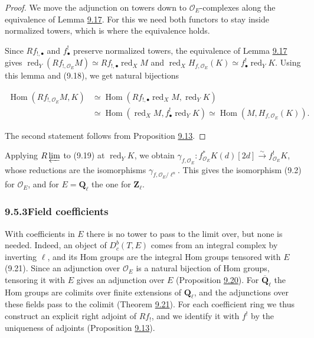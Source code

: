 \documentclass[11pt]{article}
\providecommand{\Dbc}{}\renewcommand{\Dbc}{D^b_c}
\providecommand{\Hom}{}\renewcommand{\Hom}{\operatorname{Hom}}
\begin{document}
\begin{proof}[{Proof}]\label{bp62}%
We move the adjunction on towers down to \(\mathcal O_E\)-complexes along the equivalence of Lemma \hyperref[bp55]{9.17}. For this we need both functors to stay inside normalized towers, which is where the equivalence holds.

Since \(Rf_{!,\bullet}\) and \(f^!_\bullet\) preserve normalized towers, the equivalence of Lemma \hyperref[bp55]{9.17} gives \(\operatorname{red}_Y(Rf_{!,\mathcal O_E}M)\simeq Rf_{!,\bullet}\operatorname{red}_XM\) and \(\operatorname{red}_XH_{f,\mathcal O_E}(K)\simeq f^!_\bullet\operatorname{red}_YK\). Using this lemma and (9.18), we get natural bijections

\[
\begin{aligned}
\Hom(Rf_{!,\mathcal O_E}M,K)
&\simeq\Hom(Rf_{!,\bullet}\operatorname{red}_XM,\operatorname{red}_YK)\\
&\simeq\Hom(\operatorname{red}_XM,f_\bullet^!\operatorname{red}_YK)
\simeq\Hom(M,H_{f,\mathcal O_E}(K)).
\end{aligned}
\]

The second statement follows from Proposition \hyperref[bp41]{9.13}.
\end{proof}

\label{bp63}%
Applying \(R\varprojlim\) to (9.19) at \(\operatorname{red}_YK\), we obtain \(\gamma_{f,\mathcal O_E}:f^*_{\mathcal O_E}K(d)[2d]\xrightarrow{\sim}f^!_{\mathcal O_E}K\), whose reductions are the isomorphisms \(\gamma_{f,\mathcal O_E/\ell^n}\). This gives the isomorphism (9.2) for \(\mathcal O_E\), and for \(E=\mathbf Q_\ell\) the one for \(\mathbf Z_\ell\).


\subsubsection*{\texorpdfstring{9.5.3\quad Field coefficients}{9.5.3 Field coefficients}}
\label{bp64}%
\label{bp65}%
With coefficients in \(E\) there is no tower to pass to the limit over, but none is needed. Indeed, an object of \(\Dbc(T,E)\) comes from an integral complex by inverting \(\ell\), and its Hom groups are the integral Hom groups tensored with \(E\) (9.21). Since an adjunction over \(\mathcal O_E\) is a natural bijection of Hom groups, tensoring it with \(E\) gives an adjunction over \(E\) (Proposition \hyperref[bp66]{9.20}). For \(\overline{\mathbf Q}_\ell\) the Hom groups are colimits over finite extensions of \(\mathbf Q_\ell\), and the adjunctions over these fields pass to the colimit (Theorem \hyperref[bp69]{9.21}). For each coefficient ring we thus construct an explicit right adjoint of \(Rf_!\), and we identify it with \(f^!\) by the uniqueness of adjoints (Proposition \hyperref[bp41]{9.13}).
\end{document}
